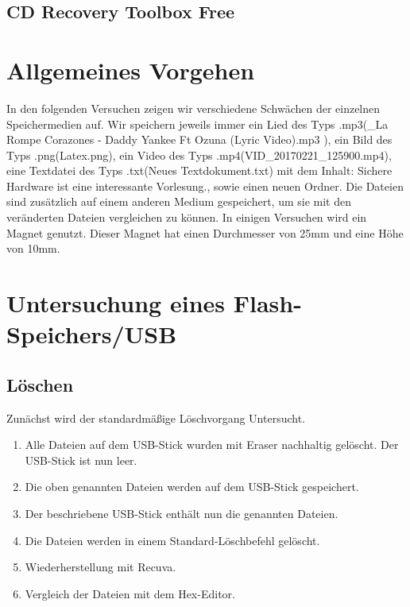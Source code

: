 \documentclass[10pt,a4paper]{article} %
\begin{document}
\subsection{CD Recovery Toolbox Free}%




\newpage
\section{Allgemeines Vorgehen}

In den folgenden Versuchen zeigen wir verschiedene Schwächen der einzelnen Speichermedien auf. Wir speichern jeweils immer ein Lied des Typs .mp3(\_La Rompe Corazones - Daddy Yankee Ft Ozuna (Lyric Video).mp3\grqq{} ), ein Bild des Typs .png(\glqq Latex.png\grqq{}), ein Video des Typs .mp4(\glqq VID\_20170221\_125900.mp4\grqq{}), eine Textdatei des Typs .txt(\glqq Neues Textdokument.txt\grqq{}) mit dem Inhalt: \glqq Sichere Hardware ist eine interessante Vorlesung.\grqq{}, sowie einen neuen Ordner. Die Dateien sind zusätzlich auf einem anderen Medium gespeichert, um sie mit den veränderten Dateien vergleichen zu können. In einigen Versuchen wird ein Magnet genutzt. Dieser Magnet hat einen Durchmesser von 25mm und eine Höhe von 10mm.

\section{Untersuchung eines Flash-Speichers/USB}


\subsection{Löschen}
\label{Löschen}
Zunächst wird der standardmäßige Löschvorgang Untersucht.
\begin{enumerate}
\item Alle Dateien auf dem USB-Stick wurden mit Eraser nachhaltig gelöscht. Der USB-Stick ist nun \glqq leer\grqq{}.
\item Die oben genannten Dateien werden auf dem USB-Stick gespeichert.
\item Der beschriebene USB-Stick enthält nun die genannten Dateien.
\item Die Dateien werden in einem Standard-Löschbefehl gelöscht.
\item Wiederherstellung mit Recuva.
\item Vergleich der Dateien mit dem Hex-Editor.
\end{enumerate}
\end{document}
